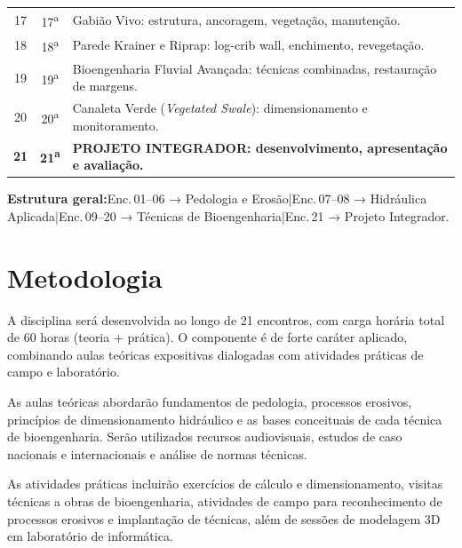 \documentclass[11pt,a4paper]{article}
\begin{document}
\begin{small}
\begin{tabularx}{\textwidth}{@{}c c X@{}}
17 & 17\textsuperscript{a} & Gabião Vivo: estrutura, ancoragem, vegetação, manutenção. \\
18 & 18\textsuperscript{a} & Parede Krainer e Riprap: log-crib wall, enchimento, revegetação. \\
19 & 19\textsuperscript{a} & Bioengenharia Fluvial Avançada: técnicas combinadas, restauração de margens. \\
20 & 20\textsuperscript{a} & Canaleta Verde (\textit{Vegetated Swale}): dimensionamento e monitoramento. \\
\rowcolor{uefslight!70!white}
\textbf{21} & \textbf{21\textsuperscript{a}} & \textbf{\textsf{PROJETO INTEGRADOR}: desenvolvimento, apresentação e avaliação.} \\
\bottomrule
\end{tabularx}
\end{small}

\begin{tcolorbox}[uefsbox]
\textbf{Estrutura geral:}\enspace Enc.\,01--06 → Pedologia e Erosão\enspace|\enspace Enc.\,07--08 → Hidráulica Aplicada\enspace|\enspace Enc.\,09--20 → Técnicas de Bioengenharia\enspace|\enspace Enc.\,21 → Projeto Integrador.
\end{tcolorbox}


\section*{Metodologia}

A disciplina será desenvolvida ao longo de 21 encontros, com carga horária total de 60 horas (teoria + prática). O componente é de forte caráter aplicado, combinando aulas teóricas expositivas dialogadas com atividades práticas de campo e laboratório.

As aulas teóricas abordarão fundamentos de pedologia, processos erosivos, princípios de dimensionamento hidráulico e as bases conceituais de cada técnica de bioengenharia. Serão utilizados recursos audiovisuais, estudos de caso nacionais e internacionais e análise de normas técnicas.

As atividades práticas incluirão exercícios de cálculo e dimensionamento, visitas técnicas a obras de bioengenharia, atividades de campo para reconhecimento de processos erosivos e implantação de técnicas, além de sessões de modelagem 3D em laboratório de informática.
\end{document}
